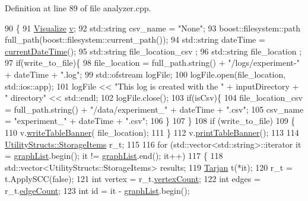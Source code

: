 Definition at line 89 of file analyzer.\+cpp.


\begin{DoxyCode}
90 \{
91     \hyperlink{class_visualize}{Visualize} \hyperlink{class_analyzer_ae32079d0816589617a0c76b1d4cf881b}{v};
92     std::string csv\_name = \textcolor{stringliteral}{"None"};
93     boost::filesystem::path full\_path(boost::filesystem::current\_path());
94     std::string dateTime = \hyperlink{class_analyzer_a9108681fee1078aed1af2ddee58cc55c}{currentDateTime}();
95     std::string file\_location\_csv ;
96     std::string file\_location ;
97     \textcolor{keywordflow}{if}(write\_to\_file)\{
98         file\_location = full\_path.string() + \textcolor{stringliteral}{"/logs/experiment-"} + dateTime + \textcolor{stringliteral}{".log"};
99         std::ofstream logFile;
100         logFile.open(file\_location, std::ios::app);
101         logFile << \textcolor{stringliteral}{"This log is created with the "} + inputDirectory + \textcolor{stringliteral}{" directory"} << std::endl;
102         logFile.close();
103         \textcolor{keywordflow}{if}(isCsv)\{
104             file\_location\_csv = full\_path.string() + \textcolor{stringliteral}{"/data/experiment\_"} + dateTime + \textcolor{stringliteral}{".csv"};
105             csv\_name = \textcolor{stringliteral}{"experiment\_"} + dateTime + \textcolor{stringliteral}{".csv"};
106         \}
107     \}
108     \textcolor{keywordflow}{if} (write\_to\_file)
109     \{
110         v.\hyperlink{class_visualize_a14c9e9721eeaca0afde25da0138b43b8}{writeTableBanner}( file\_location);
111     \}
112     v.\hyperlink{class_visualize_a3e1aa31f14abdf3cf53662cddc536c6a}{printTableBanner}();
113 
114     \hyperlink{struct_utility_structs_1_1_storage_items}{UtilityStructs::StorageItems} r\_t;
115 
116     \textcolor{keywordflow}{for} (std::vector<std::string>::iterator it = \hyperlink{class_analyzer_a567b5d8b2bbdde28b489834c1644446e}{graphList}.begin(); it != 
      \hyperlink{class_analyzer_a567b5d8b2bbdde28b489834c1644446e}{graphList}.end(); it++)
117     \{
118         std::vector<UtilityStructs::StorageItems> results;
119         \hyperlink{class_tarjan}{Tarjan} t(*it);
120         r\_t = t.ApplySCC(\textcolor{keyword}{false});
121         \textcolor{keywordtype}{int} vertex = r\_t.\hyperlink{struct_utility_structs_1_1_storage_items_af72522be713f23fcfe3ac66780183fda}{vertexCount};
122         \textcolor{keywordtype}{int} edges = r\_t.\hyperlink{struct_utility_structs_1_1_storage_items_afafcba9bb103108e2c1e1d9254fb75c5}{edgeCount};
123         \textcolor{keywordtype}{int} \textcolor{keywordtype}{id} = it - \hyperlink{class_analyzer_a567b5d8b2bbdde28b489834c1644446e}{graphList}.begin();

\end{DoxyCode}
